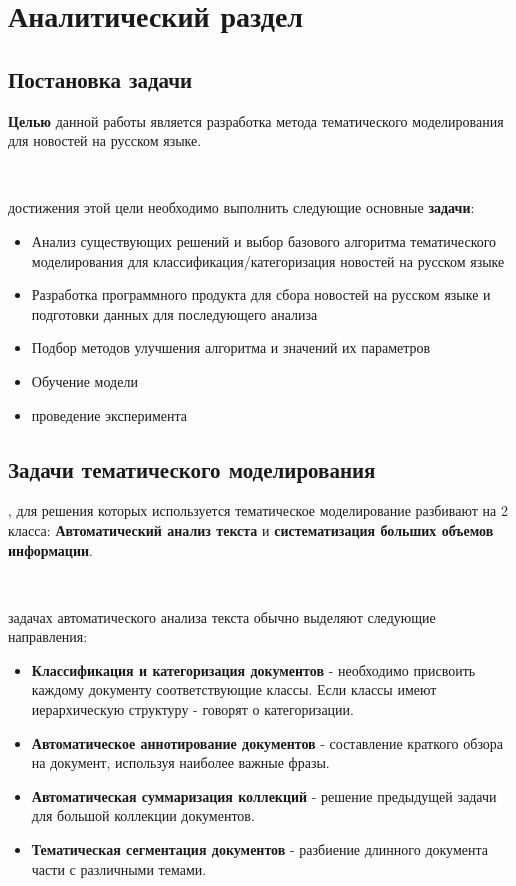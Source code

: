 \chapter{Аналитический раздел}

%
\section{Постановка задачи}

\noindent\textbf{Целью} данной работы является разработка метода тематического моделирования для новостей на русском языке.

~\

 достижения этой цели необходимо выполнить следующие основные \textbf{задачи}:

\begin{itemize}
    \item \todo{}Анализ существующих решений и выбор базового алгоритма тематического моделирования для классификация/категоризация новостей на русском языке
    \item Разработка программного продукта для сбора новостей на русском языке и подготовки данных для последующего анализа
    \item Подбор методов улучшения алгоритма и значений их параметров
    \item Обучение модели
    \item \todo{}проведение эксперимента
\end{itemize}

%
\section{Задачи тематического моделирования}


, для решения которых используется тематическое моделирование разбивают на 2 класса: \textbf{Автоматический анализ текста} и \textbf{систематизация больших объемов информации}.

~\

 задачах автоматического анализа текста обычно выделяют следующие направления:

\begin{itemize}
    \item \textbf{Классификация и категоризация документов} - необходимо присвоить каждому документу соответствующие классы. Если классы имеют иерархическую структуру - говорят о категоризации.
    \item \textbf{Автоматическое аннотирование документов} - составление краткого обзора на документ, используя наиболее важные фразы.
    \item \textbf{Автоматическая суммаризация коллекций} - решение предыдущей задачи для большой коллекции документов.
    \item \textbf{Тематическая сегментация документов} - разбиение длинного документа части с различными темами.
\end{itemize}


